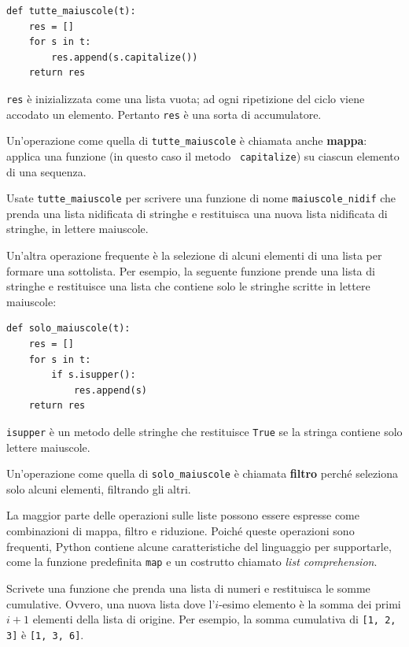 \documentclass[10pt]{book}
\begin{document}
\begin{verbatim}
def tutte_maiuscole(t):
    res = []
    for s in t:
        res.append(s.capitalize())
    return res
\end{verbatim}
%
{\tt res} è inizializzata come una lista vuota; ad ogni ripetizione del ciclo viene accodato un elemento. Pertanto {\tt res} è una sorta di accumulatore.

Un'operazione come quella di \verb"tutte_maiuscole" è chiamata anche {\bf
mappa}: applica una funzione (in questo caso il metodo {\tt
capitalize}) su ciascun elemento di una sequenza.

\vspace{0.2in}
\begin{exercise}

Usate \verb"tutte_maiuscole" per scrivere una funzione di nome \verb"maiuscole_nidif" che prenda una lista nidificata di stringhe e restituisca una nuova lista nidificata di stringhe, in lettere maiuscole.

\end{exercise}

Un'altra operazione frequente è la selezione di alcuni elementi di una lista per formare una sottolista. Per esempio, la seguente funzione prende una lista di stringhe e restituisce una lista che contiene solo le stringhe scritte in lettere maiuscole:

\begin{verbatim}
def solo_maiuscole(t):
    res = []
    for s in t:
        if s.isupper():
            res.append(s)
    return res
\end{verbatim}
%
{\tt isupper} è un metodo delle stringhe che restituisce {\tt True} se la stringa contiene solo lettere maiuscole.

Un'operazione come quella di \verb"solo_maiuscole" è chiamata {\bf filtro} perché seleziona solo alcuni elementi, filtrando gli altri.

La maggior parte delle operazioni sulle liste possono essere espresse come combinazioni di mappa, filtro e riduzione. Poiché queste operazioni sono frequenti, Python contiene alcune caratteristiche del linguaggio per supportarle, come la funzione predefinita {\tt map} e un costrutto chiamato {\em list comprehension}.

\vspace{0.2in}
\begin{exercise}
\label{cumulative}

Scrivete una funzione che prenda una lista di numeri e restituisca le somme cumulative. Ovvero, una nuova lista dove l'$i$-esimo elemento è la somma dei primi $i+1$ elementi della lista di origine. Per esempio, la somma cumulativa di {\tt [1, 2, 3]} è {\tt [1, 3, 6]}. 
\end{exercise}
\end{document}
